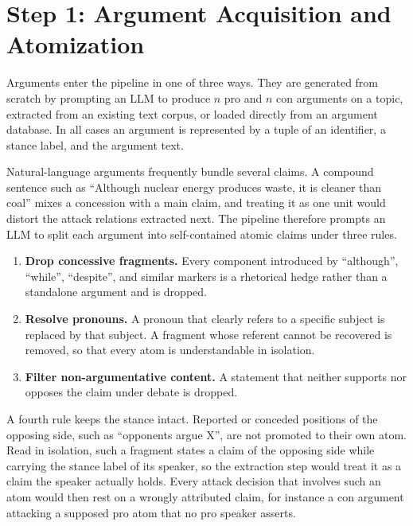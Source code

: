\section{Step 1: Argument Acquisition and Atomization}
\label{sec:method:atomize}

Arguments enter the pipeline in one of three ways. They are generated from
scratch by prompting an LLM to produce $n$ pro and $n$ con arguments on a topic,
extracted from an existing text corpus, or loaded directly from an argument
database. In all cases an argument is represented by a tuple of an identifier, a
stance label, and the argument text.

Natural-language arguments frequently bundle several claims. A compound sentence
such as ``Although nuclear energy produces waste, it is cleaner than coal''
mixes a concession with a main claim, and treating it as one unit would distort
the attack relations extracted next. The pipeline therefore prompts an LLM to
split each argument into self-contained atomic claims under three rules.

\begin{enumerate}
  \item \textbf{Drop concessive fragments.} Every component introduced by
    ``although'', ``while'', ``despite'', and similar markers is a rhetorical
    hedge rather than a standalone argument and is dropped.
  \item \textbf{Resolve pronouns.} A pronoun that clearly refers to a specific
    subject is replaced by that subject. A fragment whose referent cannot be
    recovered is removed, so that every atom is understandable in isolation.
  \item \textbf{Filter non-argumentative content.} A statement that neither
    supports nor opposes the claim under debate is dropped.
\end{enumerate}

A fourth rule keeps the stance intact. Reported or conceded positions of the
opposing side, such as ``opponents argue X'', are not promoted to their own
atom. Read in isolation, such a fragment states a claim of the opposing side
while carrying the stance label of its speaker, so the extraction step would
treat it as a claim the speaker actually holds. Every attack decision that
involves such an atom would then rest on a wrongly attributed claim, for
instance a con argument attacking a supposed pro atom that no pro speaker
asserts.

